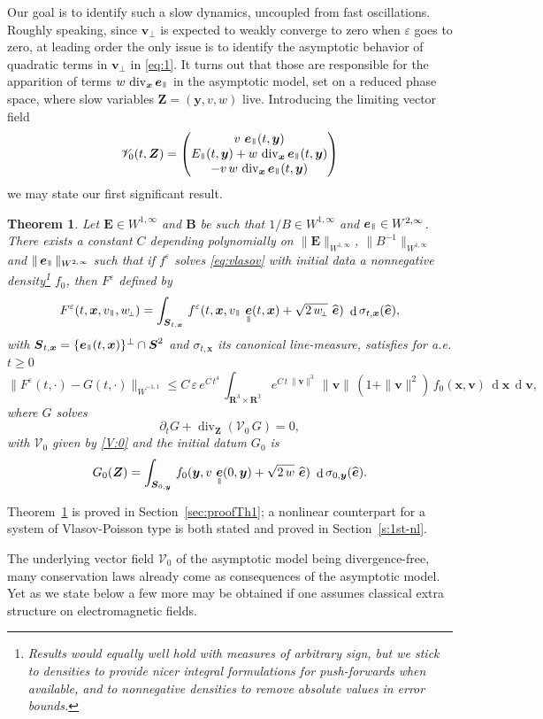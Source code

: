 \documentclass[10pt]{amsart}
\let\mathcal\mathscr
\newcommand{\sperp}{{\scriptscriptstyle\perp}}
\let\eps\varepsilon
\let\d\partial
\DeclareMathOperator\dD{d}\let\dd\dD
\DeclareMathOperator{\Div}{div}
\theoremstyle{plain}
\newtheorem{theorem}{Theorem}[section]
\theoremstyle{definition}
\newcommand\bp{\begin{pmatrix}}
\newcommand\ep{\end{pmatrix}}
\newcommand{\be}{\begin{equation}}
\newcommand{\ee}{\end{equation}}
\newcommand{\bt}{\begin{theorem}}
\newcommand{\et}{\end{theorem}}
\newcommand\R{\mathbf R}
\newcommand\bB{{\boldsymbol B}}
\newcommand\bE{{\boldsymbol E}}
\newcommand\bS{{\boldsymbol S}}
\newcommand\bfv{{\boldsymbol v}}
\newcommand\bfx{{\boldsymbol x}}
\newcommand\bfy{{\boldsymbol y}}
\newcommand\bfZ{{\boldsymbol Z}}
\newcommand\cV{{\mathcal V}}
\DeclareMathOperator{\beD}{\boldsymbol{e}}
\newcommand\eDpar{\beD_\mypar}
\newcommand\bvperp{\bfv_{\!\sperp}}
\newcommand\eperp{w_{\!\sperp}}
\let\e w
\newcommand\Epar{E_\mypar}
\newcommand{\mypar}{{\mkern3mu\vphantom{\perp}\vrule depth 0pt\mkern2mu\vrule depth 0pt\mkern3mu}}
\begin{document}
Our goal is to identify such a slow dynamics, uncoupled from fast oscillations. Roughly speaking, since $\bvperp$ is expected to weakly converge to zero when $\eps$ goes to zero, at leading order the only issue is to identify the asymptotic behavior of quadratic terms in $\bvperp$ in \eqref{eq:1}. It turns out that those are responsible for the apparition of terms $\e\,\Div_\bfx\eDpar$ in the asymptotic model, set on a reduced phase space, where slow variables $\bfZ=(\bfy,v,\e)$ live. Introducing the limiting vector field
\be
\label{V:0}
\cV_0(t,\bfZ)
=\bp
v\,\eDpar(t,\bfy)\\
\Epar(t,\bfy)+\e\,\Div_\bfx\eDpar(t,\bfy)\\
-v\,\e\,\Div_\bfx\eDpar(t,\bfy)
\ep
\ee
we may state our first significant result.

\bt\label{th:1}
Let $\bE\in W^{1,\infty}$ and $\bB$ be such that $1/B\in W^{1,\infty}$ and $\eDpar\in W^{2,\infty}$. There exists a constant $C$ depending polynomially on $\|\bE\|_{W^{1,\infty}}$, $\|B^{-1}\|_{W^{1,\infty}}$ and $\|\eDpar\|_{W^{2,\infty}}$ such that if $f^\eps$ solves \eqref{eq:vlasov} with initial data a nonnegative density\footnote{Results would equally well hold with measures of arbitrary sign, but we stick to densities to provide nicer integral formulations for push-forwards when available, and to nonnegative densities to remove absolute values in error bounds.} $f_0$, then $F^\eps$ defined by
\[
F^\eps(t,\bfx,v_\mypar,\eperp)=\int_{\bS_{t,\bfx}}\,f^\eps(t,\bfx,v_\mypar\,\eDpar(t,\bfx)+\sqrt{2\,\eperp}\ \widehat{\beD})\ \dD \sigma_{t,\bfx}(\widehat{\beD}),
\]
with $\bS_{t,\bfx}=\{\eDpar(t,\bfx)\}^\perp\cap\bS^2$ and $\sigma_{t,\bfx}$ its canonical line-measure, satisfies for a.e. $t\geq0$
\[
\|F^\eps(t,\cdot)-G(t,\cdot)\|_{\dot{W}^{-1,1}}
\leq C\,\eps\,e^{C\,t^4}\,\int_{\R^3\times\R^3} e^{C\,t\,\|\bfv\|^3}\,\|\bfv\|\,(1+\|\bfv\|^2)\,f_0(\bfx,\bfv)\,\dD\bfx\,\dD\bfv,
\]
where $G$ solves
\be
\label{eq:1st}
\d_t G+\Div_\bfZ \left(\cV_0\,G \right) =0,
\ee
with $\cV_0$ given by \eqref{V:0} and the initial datum $G_0$ is
\[
G_0(\bfZ)=\int_{\bS_{0,\bfy}}\,f_0(\bfy,v\,\eDpar(0,\bfy)+\sqrt{2\,\e}\ \widehat{\beD})\ \dD \sigma_{0,\bfy}(\widehat{\beD}).
\]
\et
Theorem~\ref{th:1} is proved in Section~\ref{sec:proofTh1}; a nonlinear counterpart for a system of Vlasov-Poisson type is both stated and proved in Section~\ref{s:1st-nl}.

The underlying vector field $\cV_0$ of the asymptotic model being divergence-free, many conservation laws already come as consequences of the asymptotic model. Yet as we state below a few more may be obtained if one assumes classical extra structure on electromagnetic fields.
\end{document}
